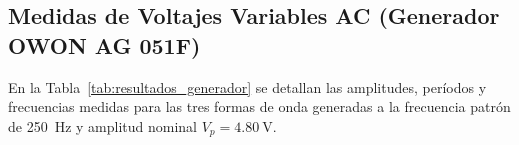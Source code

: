 \subsection{Medidas de Voltajes Variables AC (Generador OWON AG 051F)}
En la Tabla~\ref{tab:resultados_generador} se detallan las amplitudes, períodos y frecuencias medidas para las tres formas de onda generadas a la frecuencia patrón de \qty{250}{\hertz} y amplitud nominal $V_p = \qty{4,80}{\volt}$.

\begin{table}[H]
    \centering
    \caption{Mediciones experimentales para ondas senoidal, triangular y cuadrada generadas a \qty{250}{\hertz}.}
    \label{tab:resultados_generador}
\end{table}
